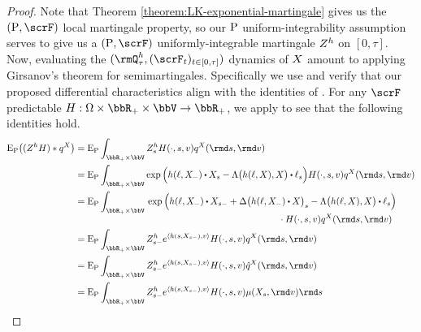 \begin{proof}
  \label{proof:theorem:LK-girsanov}
  Note that Theorem \ref{theorem:LK-exponential-martingale} gives us the $(\Prb, \scrF)$ local martingale property, so our ${\operatorname{P}}$ uniform-integrability assumption serves to give us a $(\Prb, \scrF)$ uniformly-integrable martingale $Z^h$ on $[0,\tau]$.
  Now, evaluating the $(\mgPrb^\twistFunc_\tau, (\scrF_t)_{t\in[0,\tau]})$ dynamics of $X$ amount to applying Girsanov's theorem for semimartingales.
  Specifically we use \cite[Theorem III.3.24]{jacod2003} and verify that our proposed differential characteristics align with the identities of \cite[III.3.28]{jacod2003}.
  For any $\scrF$ predictable $H: \Omega \times \bbR_+ \times \vecSpace \rightarrow \bbR_+$, we apply \cite[Remark I.4.36]{jacod2003} to see that the following identities hold.
  \begin{align*}
    \Exp_\Prb \big( (\mgDensity^\twistFunc H) \ast \jumpMeas^\X \big)
    &= \Exp_\Prb \int_{\bbR_+ \times \vecSpace} \mgDensity^\twistFunc_s H(\cdot, s, \markVar) \jumpMeas^\X(\rmd s, \rmd\markVar) \\
    &= \Exp_\Prb \int_{\bbR_+ \times \vecSpace} \exp\Big( \twistFunc(\leb, \X_-) \shortInt \X_s - \ode\big( \twistFunc(\leb, \X), \X \big) \shortInt \leb_s \Big) H(\cdot, s, \markVar) \jumpMeas^\X(\rmd s, \rmd\markVar) \\
    &= \Exp_\Prb \int_{\bbR_+ \times \vecSpace} \begin{aligned}[t]
      &\exp\Big( \twistFunc(\leb, \X_-) \shortInt \X_{s-} + \Delta\big(\twistFunc(\leb, \X_-) \shortInt \X\big)_s - \ode\big( \twistFunc(\leb, \X), \X \big) \shortInt \leb_s \Big)  \\
      &\hspace{5cm} \cdot H(\cdot, s, \markVar) \jumpMeas^\X(\rmd s, \rmd\markVar) 
    \end{aligned} \\
    &= \Exp_\Prb \int_{\bbR_+ \times \vecSpace} \mgDensity^\twistFunc_{s-} e^\prj{\twistFunc(s, \X_{s-})}{\markVar} H(\cdot, s, \markVar) \jumpMeas^\X(\rmd s, \rmd\markVar)  \\
    &= \Exp_\Prb \int_{\bbR_+ \times \vecSpace} \mgDensity^\twistFunc_{s-} e^\prj{\twistFunc(s, \X_{s-})}{\markVar} H(\cdot, s, \markVar) \predproj{\jumpMeas^\X}(\rmd s, \rmd\markVar)  \\
    &= \Exp_\Prb \int_{\bbR_+ \times \vecSpace} \mgDensity^\twistFunc_{s-} e^\prj{\twistFunc(s, \X_{s-})}{\markVar} H(\cdot, s, \markVar) \affJump(\X_s, \rmd\markVar) \rmd s  \\

\end{align*}
\end{proof}
